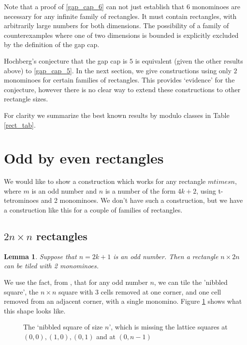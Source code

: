 \documentclass{article}
\theoremstyle{plain}
\newtheorem{lemma}[theorem]{Lemma}
\begin{document}
Note that a proof of \ref{gap_cap_6} can not just establish that $6$ monominoes are necessary for any infinite family of rectangles.
It must contain rectangles, with arbitrarily large numbers for both dimensions.
The possibility of a family of counterexamples where one of two dimensions is bounded is explicitly excluded by the definition of the gap cap.

Hochberg's conjecture that the gap cap is $5$ is equivalent (given the other results above) to \ref{gap_cap_5}.
In the next section, we give constructions using only $2$ monominoes for certain families of rectangles.
This provides `evidence' for the conjecture, however there is no clear way to extend these constructions to other rectangle sizes.

For clarity we summarize the best known results by modulo classes in Table \ref{rect_tab}.

\begin{table}
    
    \caption{Minimal required numbers of monominoes.}\label{rect_tab}
    \end{table}

\section{Odd by even rectangles}

We would like to show a construction which works for any rectangle $m times n$, where $m$ is an odd number and $n$ is a number of the form $4k + 2$, using t-tetrominoes and 2 monominoes.
We don't have such a construction, but we have a construction like this for a couple of families of rectangles.

\subsection{$2n \times n$ rectangles}

\begin{lemma}\label{2_times_1}
Suppose that $n = 2k+1$ is an odd number. Then a rectangle $n \times 2n$ can be tiled with 2 monominoes.  
\end{lemma}

We use the fact, from \cite{grahl_sq}, that for any odd number $n$, we can tile the 'nibbled square', the $n \times n$ square with 3 cells removed at one corner, and one cell removed from an adjacent corner, with a single monomino.
Figure \ref{nibbled} shows what this shape looks like.

\begin{figure}

\caption{The `nibbled square of size $n$', which is missing the lattice squares at $(0, 0), (1, 0), (0, 1)$ and at $(0, n-1)$}
\label{nibbled}
\end{figure}
\end{document}
